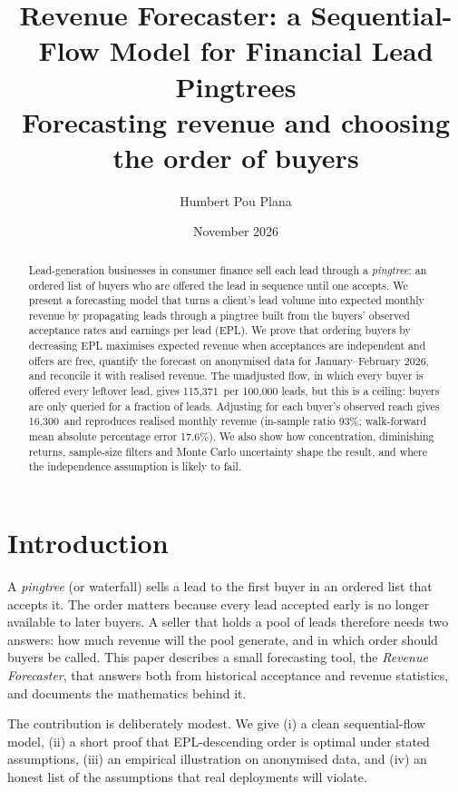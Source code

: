 \documentclass[10pt,a4paper]{article}
\begin{document}
\title{\bfseries Revenue Forecaster: a Sequential-Flow Model for Financial Lead Pingtrees\\[2pt]\large Forecasting revenue and choosing the order of buyers}
\author{Humbert Pou Plana}
\date{November 2026}
\maketitle
\begin{abstract}
Lead-generation businesses in consumer finance sell each lead through a \emph{pingtree}: an ordered list of buyers who are offered the lead in sequence until one accepts. We present a forecasting model that turns a client's lead volume into expected monthly revenue by propagating leads through a pingtree built from the buyers' observed acceptance rates and earnings per lead (EPL). We prove that ordering buyers by decreasing EPL maximises expected revenue when acceptances are independent and offers are free, quantify the forecast on anonymised data for January--February 2026, and reconcile it with realised revenue. The unadjusted flow, in which every buyer is offered every leftover lead, gives 115,371\,\texteuro{} per 100{,}000 leads, but this is a ceiling: buyers are only queried for a fraction of leads. Adjusting for each buyer's observed reach gives 16,300\,\texteuro{} and reproduces realised monthly revenue (in-sample ratio 93\%; walk-forward mean absolute percentage error 17.6\%). We also show how concentration, diminishing returns, sample-size filters and Monte Carlo uncertainty shape the result, and where the independence assumption is likely to fail.
\end{abstract}

\section{Introduction}
A \emph{pingtree} (or waterfall) sells a lead to the first buyer in an ordered list that accepts it. The order matters because every lead accepted early is no longer available to later buyers. A seller that holds a pool of leads therefore needs two answers: how much revenue will the pool generate, and in which order should buyers be called. This paper describes a small forecasting tool, the \emph{Revenue Forecaster}, that answers both from historical acceptance and revenue statistics, and documents the mathematics behind it.

The contribution is deliberately modest. We give (i) a clean sequential-flow model, (ii) a short proof that EPL-descending order is optimal under stated assumptions, (iii) an empirical illustration on anonymised data, and (iv) an honest list of the assumptions that real deployments will violate.
\end{document}
